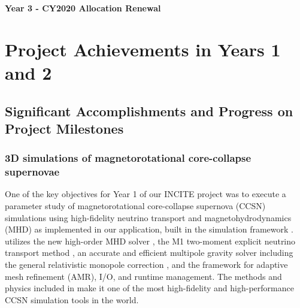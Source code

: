 \documentclass[12pt]{article}
\begin{document}
\begin{center}
  {\bf \large Year 3 - CY2020 Allocation Renewal} \vspace{-0.1in}
\end{center}

\section{Project Achievements in Years 1 and 2}

\subsection{Significant Accomplishments and Progress on Project Milestones}

\subsubsection{3D simulations of magnetorotational core-collapse supernovae}

One of the key objectives for Year 1 of our INCITE project was to execute a parameter study of magnetorotational core-collapse supernova (CCSN) simulations using high-fidelity neutrino transport and magnetohydrodynamics (MHD) as implemented in our \sparkmone application, built in the \flash simulation framework \citep{Fryxell:2000, Dubey:2009}.
\sparkmone utilizes the new \spark high-order MHD solver \citep{couch:2017}, the M1 two-moment explicit neutrino transport method \citep{Shibata:2011a, oconnor:2015, oconnor:2018}, an accurate and efficient multipole gravity solver \citep{couch:2013c} including the general relativistic monopole correction \citep{Marek:2006}, and the \flash framework for adaptive mesh refinement (AMR), I/O, and runtime management.
The methods and physics included in \sparkmone make it one of the most high-fidelity and high-performance CCSN simulation tools in the world.

\end{document}

